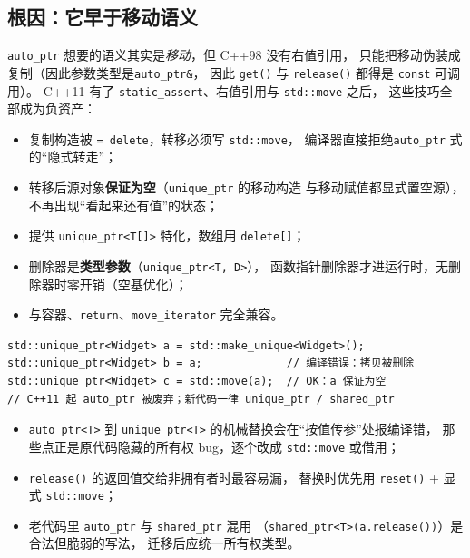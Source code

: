 \documentclass[12pt,a4paper,fontset=fandol]{ctexbook}
\begin{document}
\subsection{根因：它早于移动语义}

\texttt{auto\_ptr} 想要的语义其实是\emph{移动}，但 C++98 没有右值引用，
只能把移动伪装成复制（因此参数类型是\texttt{auto\_ptr\&}，
因此 \texttt{get()} 与 \texttt{release()} 都得是 \texttt{const} 可调用）。
C++11 有了 \texttt{static\_assert}、右值引用与 \texttt{std::move} 之后，
这些技巧全部成为负资产：

\begin{itemize}
  \item 复制构造被 \texttt{= delete}，转移必须写 \texttt{std::move}，
        编译器直接拒绝\texttt{auto\_ptr} 式的``隐式转走''；
  \item 转移后源对象\textbf{保证为空}（\texttt{unique\_ptr} 的移动构造
        与移动赋值都显式置空源），不再出现``看起来还有值''的状态；
  \item 提供 \texttt{unique\_ptr<T[]>} 特化，数组用 \texttt{delete[]}；
  \item 删除器是\textbf{类型参数}（\texttt{unique\_ptr<T, D>}），
        函数指针删除器才进运行时，无删除器时零开销（空基优化）；
  \item 与容器、\texttt{return}、\texttt{move\_iterator} 完全兼容。
\end{itemize}

\begin{lstlisting}
std::unique_ptr<Widget> a = std::make_unique<Widget>();
std::unique_ptr<Widget> b = a;             // 编译错误：拷贝被删除
std::unique_ptr<Widget> c = std::move(a);  // OK：a 保证为空
// C++11 起 auto_ptr 被废弃；新代码一律 unique_ptr / shared_ptr
\end{lstlisting}

\begin{warning}[title=迁移 auto\_ptr 代码的实操要点]
\begin{itemize}
  \item \texttt{auto\_ptr<T>} 到 \texttt{unique\_ptr<T>}
        的机械替换会在``按值传参''处报编译错，
        那些点正是原代码隐藏的所有权 bug，逐个改成 \texttt{std::move} 或借用；
  \item \texttt{release()} 的返回值交给非拥有者时最容易漏，
        替换时优先用 \texttt{reset()} + 显式 \texttt{std::move}；
  \item 老代码里 \texttt{auto\_ptr} 与 \texttt{shared\_ptr} 混用
        （\texttt{shared\_ptr<T>(a.release())}）是合法但脆弱的写法，
        迁移后应统一所有权类型。
\end{itemize}
\end{warning}
\end{document}
